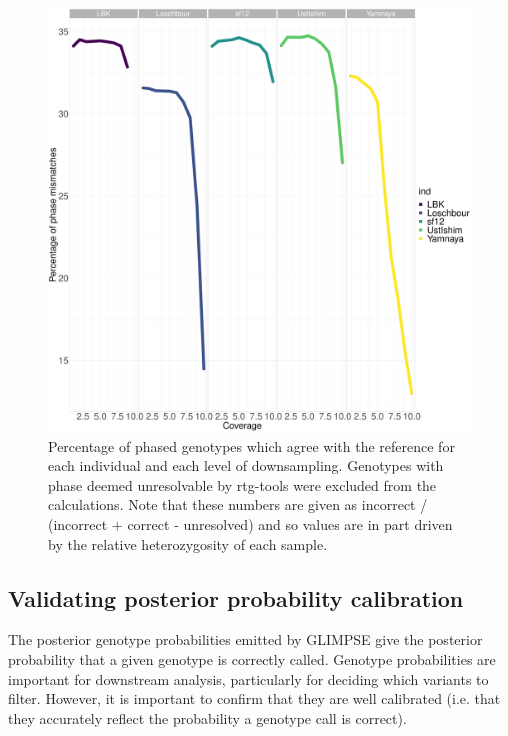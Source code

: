 \begin{figure}[htp]
    \centering
    \includegraphics[width=1.0\textwidth]{../images/chapter1/phasing_performance_downsampled.pdf}
    \caption{Percentage of phased genotypes which agree with the reference for each individual and each level of downsampling. Genotypes with phase deemed unresolvable by rtg-tools were excluded from the calculations. Note that these numbers are given as incorrect / (incorrect + correct - unresolved) and so values are in part driven by the relative heterozygosity of each sample.}
    \label{fig:phasing_performance_downsampled}
\end{figure}

\subsection{Validating posterior probability calibration}

The posterior genotype probabilities emitted by GLIMPSE give the posterior probability that a given genotype is correctly called. Genotype probabilities are important for downstream analysis, particularly for deciding which variants to filter. However, it is important to confirm that they are well calibrated (i.e. that they accurately reflect the probability a genotype call is correct).

